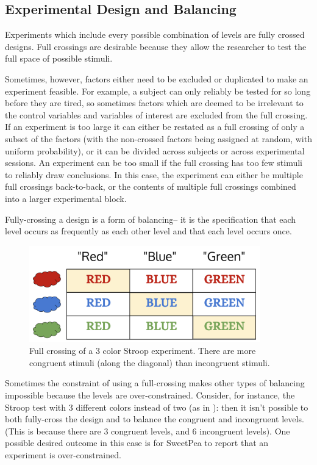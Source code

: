 \subsection{Experimental Design and Balancing}

Experiments which include every possible combination of levels are fully crossed designs. Full crossings are desirable because they allow the researcher to test the full space of possible stimuli.

Sometimes, however, factors either need to be excluded or duplicated to make an experiment feasible. For example, a subject can only reliably be tested for so long before they are tired, so sometimes factors which are deemed to be irrelevant to the control variables and variables of interest are excluded from the full crossing. If an experiment is too large it can either be restated as a full crossing of only a subset of the factors (with the non-crossed factors being assigned at random, with uniform probability), or it can be divided across subjects or across experimental sessions. An experiment can be too small if the full crossing has too few stimuli to reliably draw conclusions. In this case, the experiment can either be multiple full crossings back-to-back, or the contents of multiple full crossings combined into a larger experimental block.

Fully-crossing a design is a form of balancing-- it is the specification that each level occurs as frequently as each other level and that each level occurs once.

\begin{figure}[t]
    \centerline{\includegraphics[origin=c,width=10cm]{fig_weighted_crossing}}
    \caption{Full crossing of a 3 color Stroop experiment. There are more congruent stimuli (along the diagonal) than incongruent stimuli.}%
    \label{fig:weighted_crossing}%
\end{figure}

Sometimes the constraint of using a full-crossing makes other types of balancing impossible because the levels are over-constrained. Consider, for instance, the Stroop test with 3 different colors instead of two (as in ): then it isn't possible to both fully-cross the design and to balance the congruent and incongruent levels. (This is because there are 3 congruent levels, and 6 incongruent levels). One possible desired outcome in this case is for SweetPea to report that an experiment is over-constrained.

